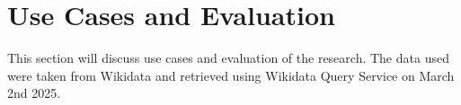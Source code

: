 \section{Use Cases and Evaluation}

This section will discuss use cases and evaluation of the research. The data used were taken from Wikidata and retrieved using Wikidata Query Service on March 2nd 2025.












